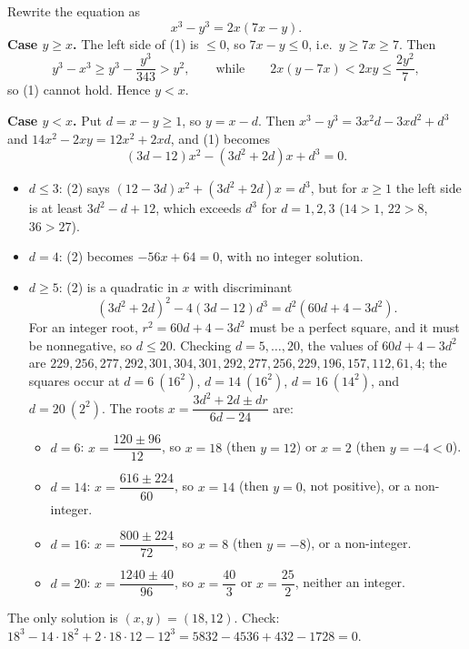 Rewrite the equation as
\[x^3-y^3=2x(7x-y).\tag{1}\]
\textbf{Case $y\ge x$.} The left side of (1) is $\le0$, so $7x-y\le0$, i.e.\ $y\ge7x\ge7$. Then
\[y^3-x^3\ge y^3-\dfrac{y^3}{343}>y^2,\qquad\text{while}\qquad 2x(y-7x)<2xy\le\dfrac{2y^2}{7},\]
so (1) cannot hold. Hence $y<x$.

\textbf{Case $y<x$.} Put $d=x-y\ge1$, so $y=x-d$. Then $x^3-y^3=3x^2d-3xd^2+d^3$ and $14x^2-2xy=12x^2+2xd$, and (1) becomes
\[(3d-12)x^2-(3d^2+2d)x+d^3=0.\tag{2}\]
\begin{itemize}
\item $d\le3$: (2) says $(12-3d)x^2+(3d^2+2d)x=d^3$, but for $x\ge1$ the left side is at least $3d^2-d+12$, which exceeds $d^3$ for $d=1,2,3$ ($14>1$, $22>8$, $36>27$).
\item $d=4$: (2) becomes $-56x+64=0$, with no integer solution.
\item $d\ge5$: (2) is a quadratic in $x$ with discriminant
\[(3d^2+2d)^2-4(3d-12)d^3=d^2\left(60d+4-3d^2\right).\]
For an integer root, $r^2=60d+4-3d^2$ must be a perfect square, and it must be nonnegative, so $d\le20$. Checking $d=5,\dots,20$, the values of $60d+4-3d^2$ are $229,256,277,292,301,304,301,292,277,256,229,196,157,112,61,4$; the squares occur at $d=6\ (16^2)$, $d=14\ (16^2)$, $d=16\ (14^2)$, and $d=20\ (2^2)$. The roots $x=\dfrac{3d^2+2d\pm dr}{6d-24}$ are:
\begin{itemize}
\item $d=6$: $x=\dfrac{120\pm96}{12}$, so $x=18$ (then $y=12$) or $x=2$ (then $y=-4<0$).
\item $d=14$: $x=\dfrac{616\pm224}{60}$, so $x=14$ (then $y=0$, not positive), or a non-integer.
\item $d=16$: $x=\dfrac{800\pm224}{72}$, so $x=8$ (then $y=-8$), or a non-integer.
\item $d=20$: $x=\dfrac{1240\pm40}{96}$, so $x=\dfrac{40}{3}$ or $x=\dfrac{25}{2}$, neither an integer.
\end{itemize}
\end{itemize}
The only solution is $\boxed{(x,y)=(18,12)}$. Check: $18^3-14\cdot18^2+2\cdot18\cdot12-12^3=5832-4536+432-1728=0$.
